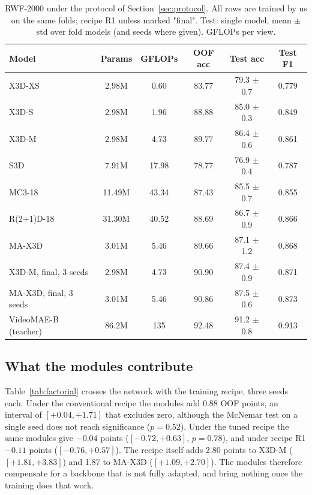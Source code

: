 \documentclass[conference]{IEEEtran}
\begin{document}
\begin{table}[t]
  \centering
  \caption{RWF-2000 under the protocol of Section~\ref{sec:protocol}. All
  rows are trained by us on the same folds; recipe R1 unless marked
  "final". Test: single model, mean $\pm$ std over fold models (and seeds
  where given). GFLOPs per view.}
  \label{tab:sota}
  \setlength{\tabcolsep}{2.5pt}
  \begin{tabular}{lccccc}
    \toprule
    Model & Params & GFLOPs & OOF acc & Test acc & Test F1 \\
    \midrule
    X3D-XS~\cite{x3d}        & 2.98M  & 0.60  & 83.77 & 79.3 $\pm$ 0.7 & 0.779 \\
    X3D-S~\cite{x3d}         & 2.98M  & 1.96  & 88.88 & 85.0 $\pm$ 0.3 & 0.849 \\
    X3D-M~\cite{x3d}         & 2.98M  & 4.73  & 89.77 & 86.4 $\pm$ 0.6 & 0.861 \\
    S3D~\cite{s3d}           & 7.91M  & 17.98 & 78.77 & 76.9 $\pm$ 0.4 & 0.787 \\
    MC3-18~\cite{r2plus1d}   & 11.49M & 43.34 & 87.43 & 85.5 $\pm$ 0.7 & 0.855 \\
    R(2+1)D-18~\cite{r2plus1d} & 31.30M & 40.52 & 88.69 & 86.7 $\pm$ 0.9 & 0.866 \\
    MA-X3D                   & 3.01M  & 5.46  & 89.66 & 87.1 $\pm$ 1.2 & 0.868 \\
    \midrule
    X3D-M, final, 3 seeds    & 2.98M  & 4.73  & 90.90 & 87.4 $\pm$ 0.9 & 0.871 \\
    MA-X3D, final, 3 seeds   & 3.01M  & 5.46  & 90.86 & 87.5 $\pm$ 0.6 & 0.873 \\
    \midrule
    VideoMAE-B~\cite{videomae} (teacher) & 86.2M & 135 & 92.48 & 91.2 $\pm$ 0.8 & 0.913 \\
    \bottomrule
  \end{tabular}
\end{table}

\subsection{What the modules contribute}
\label{sec:modules}

Table~\ref{tab:factorial} crosses the network with the training recipe,
three seeds each. Under the conventional recipe the modules add 0.88 OOF
points, an interval of $[+0.04, +1.71]$ that excludes zero, although the
McNemar test on a single seed does not reach significance ($p = 0.52$).
Under the tuned recipe the same modules give $-0.04$ points
($[-0.72, +0.63]$, $p = 0.78$), and under recipe R1 $-0.11$ points
($[-0.76, +0.57]$). The recipe itself adds 2.80 points to X3D-M
($[+1.81, +3.83]$) and 1.87 to MA-X3D ($[+1.09, +2.70]$). The modules
therefore compensate for a backbone that is not fully adapted, and bring
nothing once the training does that work.
\end{document}
